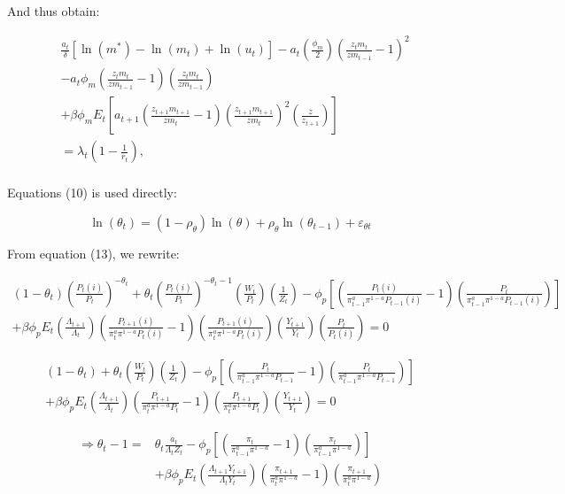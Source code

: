 \documentclass[11pt,preprint, authoryear]{elsarticle}
\numberwithin{equation}{section}
\numberwithin{figure}{section}
\numberwithin{table}{section}
\begin{document}
And thus obtain:

\[\begin{aligned} & \frac{a_{t}}{\delta}\left[\ln \left(m^{*}\right)-\ln \left(m_{t}\right)+\ln \left(u_{t}\right)\right]-a_{t}\left(\frac{\phi_{m}}{2}\right)\left(\frac{z_{t} m_{t}}{z m_{t-1}}-1\right)^{2} \\
& -a_{t} \phi_{m}\left(\frac{z_{t} m_{t}}{z m_{t-1}}-1\right)\left(\frac{z_{t} m_{t}}{z m_{t-1}}\right) \\
& +\beta \phi_{m} E_{t}\left[a_{t+1}\left(\frac{z_{t+1} m_{t+1}}{z m_{t}}-1\right)\left(\frac{z_{t+1} m_{t+1}}{z m_{t}}\right)^{2}\left(\frac{z}{z_{t+1}}\right)\right] \\
& =\lambda_{t}\left(1-\frac{1}{r_{t}}\right), \\
\end{aligned} \tag{9*}\]

Equations (10) is used directly:

\[\ln(\theta_t)=(1-\rho_{\theta})\ln(\theta)+\rho_{\theta}\ln(\theta_{t-1})+\varepsilon_{\theta t} \tag{10*}\]

From equation (13), we rewrite:

\[\begin{array}{l} (1-\theta_t)(\frac{P_t(i)}{P_t})^{-\theta_t} + \theta_t(\frac{P_t(i)}{P_t})^{-\theta_t-1}(\frac{W_t}{P_t})(\frac{1}{Z_t}) - \phi_p[(\frac{P_t(i)}{\pi_{t-1}^a \pi^{1-a}P_{t-1}(i)}-1)(\frac{P_t}{\pi_{t-1}^a \pi^{1-a}P_{t-1}(i)})] \\
+\beta\phi_pE_t(\frac{\Lambda_{t+1}}{\Lambda_{t}})(\frac{P_{t+1}(i)}{\pi_t^a\pi^{1-a}P_{t}(i)}-1)(\frac{P_{t+1}(i)}{\pi_t^a\pi^{1-a}P_{t}(i)})(\frac{Y_{t+1}}{Y_t})(\frac{P_t}{P_t(i)})=0 \end{array}\]

\[\begin{aligned} (1-\theta_t) + \theta_t (\frac{W_t}{P_t})(\frac{1}{Z_t}) - \phi_p[(\frac{P_t}{\pi_{t-1}^a \pi^{1-a}P_{t-1}}-1)(\frac{P_t}{\pi_{t-1}^a \pi^{1-a}P_{t-1}})] \\
+\beta\phi_pE_t(\frac{\Lambda_{t+1}}{\Lambda_{t}})(\frac{P_{t+1}}{\pi_t^a\pi^{1-a}P_{t}}-1)(\frac{P_{t+1}}{\pi_t^a\pi^{1-a}P_{t}})(\frac{Y_{t+1}}{Y_t})=0 \end{aligned}\]

\[\begin{aligned} \Rightarrow \theta_t - 1 = & \theta_t \frac{a_t}{\Lambda_t Z_t} - \phi_p[(\frac{\pi_t}{\pi_{t-1}^a \pi^{1-a}}-1)(\frac{\pi_t}{\pi_{t-1}^a \pi^{1-a}})] \\
& +\beta\phi_pE_t(\frac{\Lambda_{t+1}Y_{t+1}}{\Lambda_{t}Y_t})(\frac{\pi_{t+1}}{\pi_t^a\pi^{1-a}}-1)(\frac{\pi_{t+1}}{\pi_t^a\pi^{1-a}}) \end{aligned}\]
\end{document}
